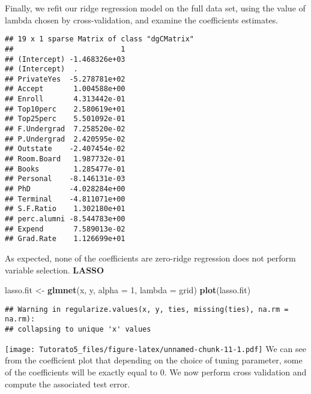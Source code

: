 \documentclass[
]{article}
\newenvironment{Shaded}{\begin{snugshade}}{\end{snugshade}}
\newcommand{\DataTypeTok}[1]{\textcolor[rgb]{0.13,0.29,0.53}{#1}}
\newcommand{\DecValTok}[1]{\textcolor[rgb]{0.00,0.00,0.81}{#1}}
\newcommand{\KeywordTok}[1]{\textcolor[rgb]{0.13,0.29,0.53}{\textbf{#1}}}
\newcommand{\NormalTok}[1]{#1}
\newcommand{\OperatorTok}[1]{\textcolor[rgb]{0.81,0.36,0.00}{\textbf{#1}}}
\newcommand{\StringTok}[1]{\textcolor[rgb]{0.31,0.60,0.02}{#1}}
\begin{document}
Finally, we refit our ridge regression model on the full data set, using
the value of lambda chosen by cross-validation, and examine the
coefficients estimates.

\begin{Shaded}
\end{Shaded}

\begin{verbatim}
## 19 x 1 sparse Matrix of class "dgCMatrix"
##                         1
## (Intercept) -1.468326e+03
## (Intercept)  .           
## PrivateYes  -5.278781e+02
## Accept       1.004588e+00
## Enroll       4.313442e-01
## Top10perc    2.580619e+01
## Top25perc    5.501092e-01
## F.Undergrad  7.258520e-02
## P.Undergrad  2.420595e-02
## Outstate    -2.407454e-02
## Room.Board   1.987732e-01
## Books        1.285477e-01
## Personal    -8.146131e-03
## PhD         -4.028284e+00
## Terminal    -4.811071e+00
## S.F.Ratio    1.302180e+01
## perc.alumni -8.544783e+00
## Expend       7.589013e-02
## Grad.Rate    1.126699e+01
\end{verbatim}

As expected, none of the coefficients are zero-ridge regression does not
perform variable selection. \textbf{LASSO}

\begin{Shaded}
\begin{Highlighting}[]
\NormalTok{lasso.fit <-}\StringTok{  }\KeywordTok{glmnet}\NormalTok{(x, y, }\DataTypeTok{alpha =} \DecValTok{1}\NormalTok{, }\DataTypeTok{lambda =}\NormalTok{ grid)}
\KeywordTok{plot}\NormalTok{(lasso.fit)}
\end{Highlighting}
\end{Shaded}

\begin{verbatim}
## Warning in regularize.values(x, y, ties, missing(ties), na.rm = na.rm):
## collapsing to unique 'x' values
\end{verbatim}

\texttt{[image: Tutorato5\_files/figure-latex/unnamed-chunk-11-1.pdf]} We
can see from the coefficient plot that depending on the choice of tuning
parameter, some of the coefficients will be exactly equal to 0. We now
perform cross validation and compute the associated test error.
\end{document}
